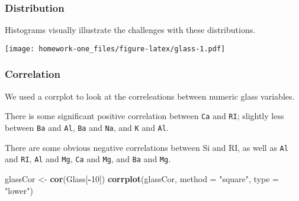 \documentclass[openany]{book}
\newenvironment{Shaded}{\begin{snugshade}}{\end{snugshade}}
\newcommand{\DataTypeTok}[1]{\textcolor[rgb]{0.13,0.29,0.53}{#1}}
\newcommand{\DecValTok}[1]{\textcolor[rgb]{0.00,0.00,0.81}{#1}}
\newcommand{\KeywordTok}[1]{\textcolor[rgb]{0.13,0.29,0.53}{\textbf{#1}}}
\newcommand{\NormalTok}[1]{#1}
\newcommand{\OperatorTok}[1]{\textcolor[rgb]{0.81,0.36,0.00}{\textbf{#1}}}
\newcommand{\StringTok}[1]{\textcolor[rgb]{0.31,0.60,0.02}{#1}}
\begin{document}
\hypertarget{distribution}{%
\subsubsection{Distribution}\label{distribution}}

Histograms visually illustrate the challenges with these distributions.

\begin{Shaded}
\end{Shaded}

\texttt{[image: homework-one\_files/figure-latex/glass-1.pdf]}

\hypertarget{correlation}{%
\subsubsection{Correlation}\label{correlation}}

We used a corrplot to look at the correleations between numeric glass variables.

There is some significant positive correlation between \texttt{Ca} and \texttt{RI}; slightly less between \texttt{Ba} and \texttt{Al}, \texttt{Ba} and \texttt{Na}, and \texttt{K} and \texttt{Al}.

There are some obvious negative correlations between Si and RI, as well as \texttt{Al} and \texttt{RI}, \texttt{Al} and \texttt{Mg}, \texttt{Ca} and \texttt{Mg}, and \texttt{Ba} and \texttt{Mg}.

\begin{Shaded}
\begin{Highlighting}[]
\NormalTok{glassCor <-}\StringTok{ }\KeywordTok{cor}\NormalTok{(Glass[}\OperatorTok{-}\DecValTok{10}\NormalTok{])}
\KeywordTok{corrplot}\NormalTok{(glassCor, }\DataTypeTok{method =} \StringTok{"square"}\NormalTok{, }\DataTypeTok{type =} \StringTok{"lower"}\NormalTok{)}
\end{Highlighting}
\end{Shaded}
\end{document}
